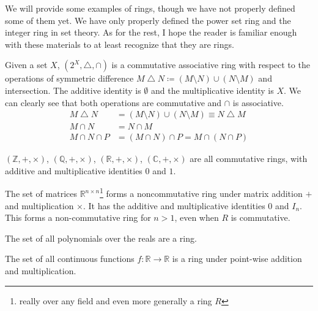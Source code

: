   We will provide some examples of rings, though we have not properly defined some of them yet. We have only properly defined the power set ring and the integer ring in set theory. As for the rest, I hope the reader is familiar enough with these materials to at least recognize that they are rings. 

  \begin{example}
    Given a set $X$, $(2^X, \bigtriangleup, \cap)$ is a commutative associative ring with respect to the operations of symmetric difference $M \bigtriangleup N \coloneqq (M \setminus N) \cup (N \setminus M)$ and intersection. The additive identity is $\emptyset$ and the multiplicative identity is $X$. We can clearly see that both operations are commutative and $\cap$ is associative. 
    \begin{align*}
      M \bigtriangleup N & = (M \setminus N) \cup (N \setminus M) \equiv N \bigtriangleup M \\
      M \cap N & = N \cap M \\
      M \cap N \cap P & = (M \cap N) \cap P = M \cap (N \cap P)
    \end{align*}
  \end{example}

  \begin{example}
    $(\mathbb{Z}, +, \times)$, $(\mathbb{Q}, +, \times)$, $(\mathbb{R}, +, \times)$, $(\mathbb{C}, +, \times)$ are all commutative rings, with additive and multiplicative identities $0$ and $1$. 
  \end{example}

  \begin{example}
    The set of matrices $\mathbb{R}^{n \times n}$\footnote{really over any field and even more generally a ring $R$} forms a noncommutative ring under matrix addition $+$ and multiplication $\times$. It has the additive and multiplicative identities $0$ and $I_{n}$. This forms a non-commutative ring for $n > 1$, even when $R$ is commutative.
  \end{example}

  \begin{example}[Polynomials]
    The set of all polynomials over the reals are a ring. 
  \end{example}

  \begin{example}
    The set of all continuous functions $f: \mathbb{R} \rightarrow \mathbb{R}$ is a ring under point-wise addition and multiplication. 
  \end{example}

